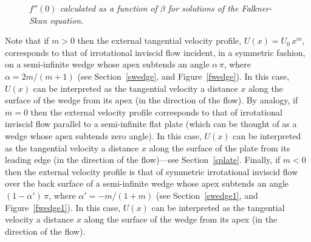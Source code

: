 \begin{figure}
\epsfysize=3.25in
\centerline{}
\caption{\em $f''(0)$ calculated as a function of $\beta$ for solutions of the Falkner-Skan equation.}\label{fbs}
\end{figure}

Note that if $m>0$  then the external tangential velocity profile, $U(x) = U_0\,x^m$,  corresponds to that of irrotational inviscid
flow  incident, in a symmetric fashion, on a semi-infinite wedge whose apex subtends an angle $\alpha\,\pi$, where $\alpha=2m/(m+1)$ (see Section~\ref{swedge}, and Figure~\ref{fwedge}). In this case, $U(x)$ can be interpreted as the tangential velocity a distance $x$
along the surface of the wedge from its apex (in the direction of the flow). 
By analogy, if $m=0$ then the external velocity profile corresponds to  that of irrotational inviscid flow parallel to a semi-infinite flat
plate (which can be thought of as a wedge whose apex subtends  zero angle).  In this case, $U(x)$ can be interpreted as the tangential velocity
 a distance $x$ along the surface of the plate from its leading edge (in the direction of the flow)---see Section~\ref{splate}.
Finally, if $m<0$ then the
external velocity profile is that of symmetric irrotational inviscid flow over the back surface of a semi-infinite wedge whose apex
subtends an angle $(1-\alpha')\,\pi$, where $\alpha'=-m/(1+m)$ (see Section~\ref{swedge1}, and Figure~\ref{fwedge1}). 
In this case, $U(x)$ can be  interpreted as the tangential velocity  a distance $x$ along the surface of the wedge from its apex  (in the
direction of the flow).

